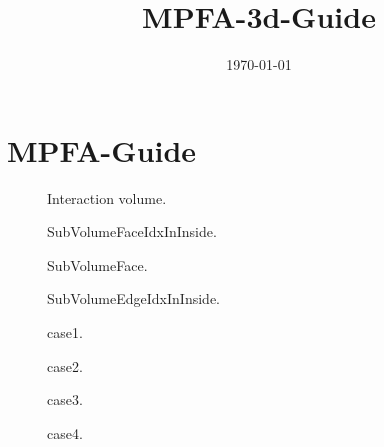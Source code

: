 \documentclass[12pt,%
                             a4paper,%
                             pagesize,%
                             twoside,%
                             cleardoublepage=plain,%
                             BCOR=12mm,%
                             headinclude=true,%
                             footinclude=false,%
                             DIV = 13]%
{scrartcl}
\begin{document}
\begin{spacing}{1}
\title{MPFA-3d-Guide}
\author{}
\date{\today}
\maketitle
\end{spacing}

\section{MPFA-Guide}
\begin{figure}
\centering

\caption{Interaction volume.}
\end{figure}

\begin{figure}
\centering

\caption{SubVolumeFaceIdxInInside.}
\end{figure}

\begin{figure}
\centering

\caption{SubVolumeFace.}
\end{figure}

\begin{figure}
\centering

\caption{SubVolumeEdgeIdxInInside.}
\end{figure}

\begin{figure}
\centering

\caption{case1.}
\end{figure}

\begin{figure}
\centering

\caption{case2.}
\end{figure}

\begin{figure}
\centering

\caption{case3.}
\end{figure}

\begin{figure}
\centering

\caption{case4.}
\end{figure}
\end{document}
